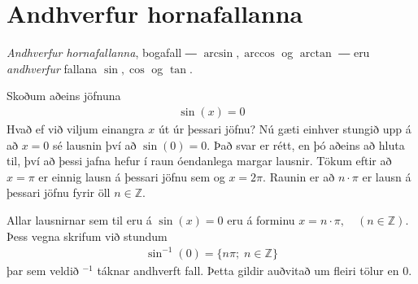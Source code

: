 \documentclass[a4paper,10pt,icelandic]{sphinxmanual}
\begin{document}
\section{Andhverfur hornafallanna}
\label{\detokenize{Kafli07:andhverfur-hornafallanna}}
\textit{Andhverfur hornafallanna}, bogafall ― \(\arcsin, \arccos\) og \(\arctan\) ― eru \textit{andhverfur} fallana \(\sin, \cos\) og \(\tan\).

Skoðum aðeins jöfnuna
\begin{equation*}
\begin{split}\sin(x) = 0\end{split}
\end{equation*}
Hvað ef við viljum einangra \(x\) út úr þessari jöfnu?
Nú gæti einhver stungið upp á að \(x = 0\) sé lausnin því að \(\sin(0) = 0\).
Það svar er rétt, en þó aðeins að hluta til, því að þessi jafna hefur í raun óendanlega margar lausnir.
Tökum eftir að \(x = \pi\) er einnig lausn á þessari jöfnu sem og \(x = 2 \pi\).
Raunin er að \(n \cdot \pi\) er lausn á þessari jöfnu fyrir öll \(n \in \mathbb{Z}\).

Allar lausnirnar sem til eru á \(\sin(x) = 0\) eru á forminu \(x=n \cdot \pi, \quad (n \in \mathbb{Z})\).
Þess vegna skrifum við stundum
\begin{equation*}
\begin{split}\sin^{-1}(0) = \{n \pi ; \; n \in \mathbb{Z}\}\end{split}
\end{equation*}
þar sem veldið \(^{-1}\) táknar andhverft fall.
Þetta gildir auðvitað um fleiri tölur en \(0\).
\end{document}

